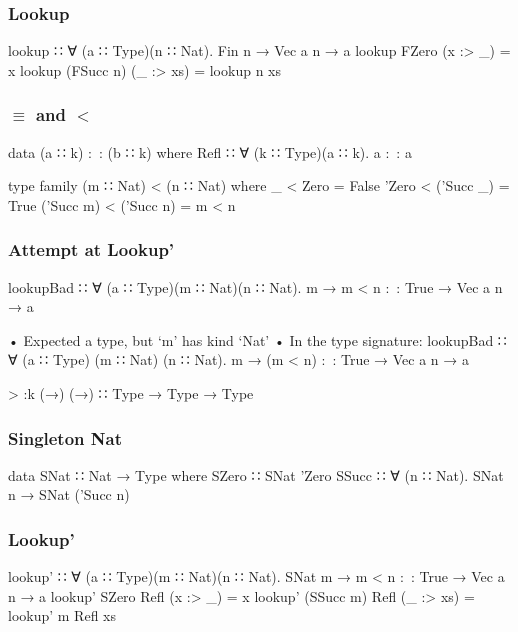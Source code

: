 \documentclass{beamer}
\begin{document}
\begin{frame}[fragile]\frametitle{Lookup}
\begin{semiverbatim}
lookup ∷ ∀ (a ∷ Type)(n ∷ Nat). Fin n → Vec a n → a
lookup FZero     (x :> _)  = x
lookup (FSucc n) (_ :> xs) = lookup n xs
\end{semiverbatim}
\end{frame}

\begin{frame}[fragile]\frametitle{$\equiv$ and $<$}
\begin{semiverbatim}
data (a ∷ k) :~: (b ∷ k) where
  Refl ∷ ∀ (k ∷ Type)(a ∷ k). a :~: a

type family (m ∷ Nat) < (n ∷ Nat) where
  _         < Zero      = False
  'Zero     < ('Succ _) = True
  ('Succ m) < ('Succ n) = m < n
\end{semiverbatim}
\end{frame}

\begin{frame}[fragile]\frametitle{Attempt at Lookup'}
\begin{semiverbatim}
lookupBad ∷ ∀ (a ∷ Type)(m ∷ Nat)(n ∷ Nat).
             m → m < n :~: True → Vec a n → a

  • Expected a type, but ‘m’ has kind ‘Nat’
  • In the type signature:
      lookupBad ∷ ∀ (a ∷ Type) (m ∷ Nat) (n ∷ Nat).
                   m → (m < n) :~: True → Vec a n → a

> :k (→)
(→) ∷ Type → Type → Type
\end{semiverbatim}
\end{frame}

\begin{frame}[fragile]\frametitle{Singleton Nat}
\begin{semiverbatim}
data SNat ∷ Nat → Type where
  SZero ∷ SNat 'Zero
  SSucc ∷ ∀ (n ∷ Nat). SNat n → SNat ('Succ n)
\end{semiverbatim}
\end{frame}

\begin{frame}[fragile]\frametitle{Lookup'}
\begin{semiverbatim}
lookup' ∷ ∀ (a ∷ Type)(m ∷ Nat)(n ∷ Nat).
           SNat m → m < n :~: True → Vec a n → a
lookup' SZero     Refl (x :> _)  = x
lookup' (SSucc m) Refl (_ :> xs) = lookup' m Refl xs
\end{semiverbatim}
\end{frame}
\end{document}
